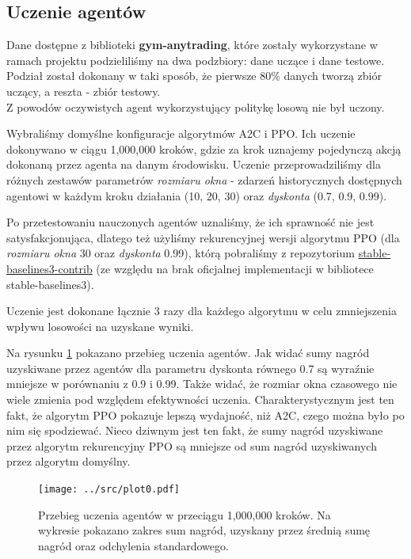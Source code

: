 \documentclass[12pt,a4paper]{article}
\begin{document}
\pagebreak
\subsection{Uczenie agentów}

Dane dostępne z biblioteki \textbf{gym-anytrading}, które zostały wykorzystane
w ramach projektu podzieliliśmy na dwa podzbiory: dane uczące i dane testowe.
Podział został dokonany w taki sposób, że pierwsze $80\%$ danych tworzą
zbiór uczący, a reszta - zbiór testowy. \\

Z powodów oczywistych agent wykorzystujący politykę losową nie był uczony.
\smallskip

Wybraliśmy domyślne konfiguracje algorytmów A2C i PPO.
Ich uczenie dokonywano w ciągu 1,000,000 kroków,
gdzie za krok uznajemy pojedynczą akcją dokonaną przez
agenta na danym środowisku. Uczenie przeprowadziliśmy dla różnych zestawów
parametrów \emph{rozmiaru okna} - zdarzeń historycznych dostępnych agentowi
w każdym kroku działania (10, 20, 30) oraz \emph{dyskonta} (0.7, 0.9, 0.99).

Po przetestowaniu nauczonych agentów uznaliśmy, że ich sprawność nie
jest satysfakcjonująca, dlatego też użyliśmy rekurencyjnej wersji
algorytmu PPO (dla \emph{rozmiaru okna} 30 oraz \emph{dyskonta} 0.99), którą
pobraliśmy z repozytorium \href{https://github.com/Stable-Baselines-Team/stable-baselines3-contrib/pull/53}
{stable-baselines3-contrib} (ze względu na brak oficjalnej implementacji
w bibliotece stable-baselines3).

Uczenie jest dokonane łącznie 3 razy
dla każdego algorytmu w celu zmniejszenia wpływu
losowości na uzyskane wyniki.

Na rysunku \ref{fig:training} pokazano przebieg uczenia agentów.
Jak widać sumy nagród uzyskiwane przez agentów dla parametru dyskonta
równego 0.7 są wyraźnie mniejsze w porównaniu z 0.9 i 0.99. Także widać, że
rozmiar okna czasowego nie wiele zmienia pod względem efektywności uczenia.
Charakterystycznym jest ten fakt, że algorytm PPO pokazuje lepszą wydajność,
niż A2C, czego można było po nim się spodziewać. Nieco dziwnym jest ten
fakt, że sumy nagród uzyskiwane przez algorytm rekurencyjny PPO są mniejsze
od sum nagród uzyskiwanych przez algorytm domyślny.

\begin{figure}[!ht]
  \centering
  \texttt{[image: ../src/plot0.pdf]}
  \caption{Przebieg uczenia agentów w przeciągu 1,000,000 kroków.
    Na wykresie pokazano zakres sum nagród, uzyskany przez
    średnią sumę nagród oraz odchylenia standardowego.}
  \label{fig:training}
\end{figure}
\end{document}
